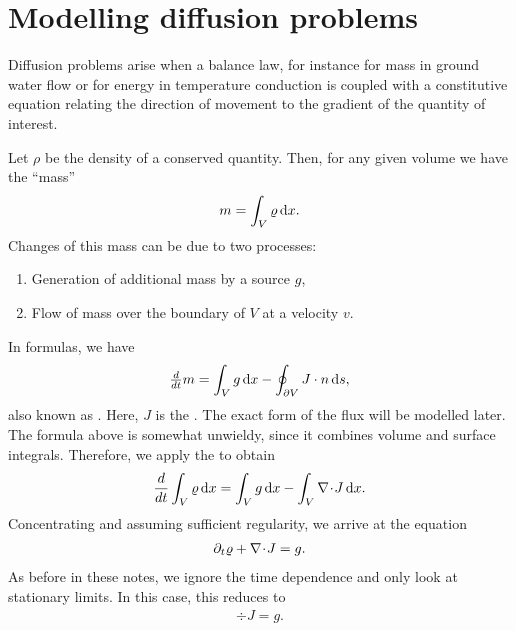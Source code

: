 
\section{Modelling diffusion problems}

\begin{intro}
  Diffusion problems arise when a balance law, for instance for mass
  in ground water flow or for energy in temperature conduction is
  coupled with a constitutive equation relating the direction of
  movement to the gradient of the quantity of interest.
\end{intro}

\begin{intro}
  Let $\rho$ be the density of a conserved quantity. Then, for any given
  volume we have the ``mass''
  \begin{gather*}
    m = \int_V \varrho\,\mathrm{d} x.
  \end{gather*}
  Changes of this mass can be due to two processes:
  \begin{enumerate}
  \item Generation of additional mass by a source $g$,
  \item Flow of mass over the boundary of $V$ at a velocity $v$.
  \end{enumerate}
  In formulas, we have
  \begin{gather*}
    \tfrac{d}{dt} m = \int_V g\,\mathrm{d} x - \oint_{\partial V} J\cdot n \,\mathrm{d} s,
  \end{gather*}
  also known as . Here, $J$ is the
  . The exact form of the flux will be modelled later.
  The formula above is somewhat unwieldy, since it combines volume and
  surface integrals. Therefore, we apply the 
  to obtain
  \begin{gather}
    \label{eq:darcy:2}
    \frac{d}{dt} \int_V \varrho\,\mathrm{d} x = \int_V g\,\mathrm{d} x - \int_V \nabla\!\cdot\! J \,\mathrm{d} x.
  \end{gather}
  Concentrating and assuming sufficient regularity, we arrive at the
  equation
  \begin{gather}
    \label{eq:darcy:3}
    \partial_t \varrho + \nabla\!\cdot\! J = g.
  \end{gather}
  As before in these notes, we ignore the time dependence and only
  look at stationary limits. In this case, this reduces to
  \begin{gather}
    \label{eq:darcy:4}
    \div J = g.
  \end{gather}
\end{intro}

